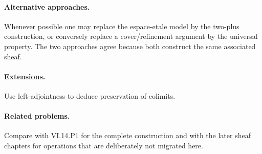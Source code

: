 \paragraph{Alternative approaches.}
Whenever possible one may replace the espace-etale model by the two-plus construction, or conversely replace a cover/refinement argument by the universal property.  The two approaches agree because both construct the same associated sheaf.

\paragraph{Extensions.}
Use left-adjointness to deduce preservation of colimits.

\paragraph{Related problems.}
Compare with VI.14.P1 for the complete construction and with the later sheaf chapters for operations that are deliberately not migrated here.
\fi
